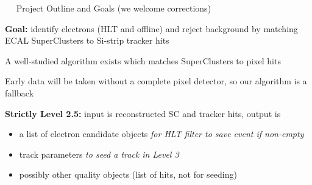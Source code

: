\documentclass[landscape]{article}
\newenvironment{slide}[1][ ]{\mbox{\bf #1 } \vfill}{\vfill \mbox{ } \hfill \Large \arabic{page} \pagebreak}
\begin{document}
\begin{slide}
Project Outline and Goals (we welcome corrections)

\vspace{0.5 cm}
\begin{center}
\begin{minipage}{0.85\linewidth}

{\bf Goal:} identify electrons (HLT and offline) and reject
background by matching ECAL SuperClusters to Si-strip tracker hits

\vspace{0.5 cm}
\begin{center}
\begin{minipage}{0.85\linewidth}
A well-studied algorithm exists which matches SuperClusters to pixel hits

\vspace{0.5 cm} Early data will be taken without a complete pixel
detector, so our algorithm is a fallback
\end{minipage}
\end{center}

\vspace{1 cm}
{\bf Strictly Level 2.5:} input is reconstructed SC and tracker hits, output is
\begin{itemize}

\item a list of electron candidate objects {\it for HLT filter to save event if non-empty}

\item track parameters {\it to seed a track in Level 3}

\item possibly other quality objects (list of hits, not for seeding)

\end{itemize}

\end{minipage}
\end{center}
\end{slide}
\end{document}
